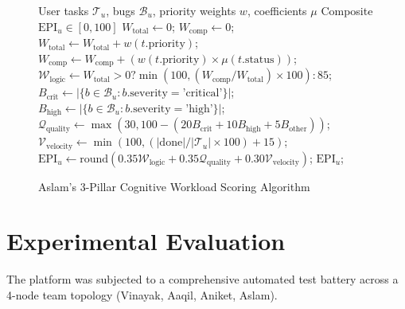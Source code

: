\documentclass[conference]{IEEEtran}
\begin{document}
\begin{figure}[!ht]
\begin{algorithmic}[1]
\REQUIRE User tasks $\mathcal{T}_u$, bugs $\mathcal{B}_u$, priority weights $w$, coefficients $\mu$
\ENSURE Composite $\text{EPI}_u \in [0, 100]$
\STATE $W_{\text{total}} \leftarrow 0$; $W_{\text{comp}} \leftarrow 0$;
    \STATE $W_{\text{total}} \leftarrow W_{\text{total}} + w(t.\text{priority})$;
    \STATE $W_{\text{comp}} \leftarrow W_{\text{comp}} + (w(t.\text{priority}) \times \mu(t.\text{status}))$;
\ENDFOR
\STATE $\mathcal{W}_{\text{logic}} \leftarrow W_{\text{total}} > 0 ? \min(100, (W_{\text{comp}} / W_{\text{total}}) \times 100) : 85$;
\STATE $B_{\text{crit}} \leftarrow |\{b \in \mathcal{B}_u : b.\text{severity} = \text{'critical'}\}|$;
\STATE $B_{\text{high}} \leftarrow |\{b \in \mathcal{B}_u : b.\text{severity} = \text{'high'}\}|$;
\STATE $\mathcal{Q}_{\text{quality}} \leftarrow \max(30, 100 - (20 B_{\text{crit}} + 10 B_{\text{high}} + 5 B_{\text{other}}))$;
\STATE $\mathcal{V}_{\text{velocity}} \leftarrow \min(100, (|\text{done}| / |\mathcal{T}_u| \times 100) + 15)$;
\STATE $\text{EPI}_u \leftarrow \text{round}(0.35 \mathcal{W}_{\text{logic}} + 0.35 \mathcal{Q}_{\text{quality}} + 0.30 \mathcal{V}_{\text{velocity}})$;
\RETURN $\text{EPI}_u$;
\end{algorithmic}
\caption{Aslam's 3-Pillar Cognitive Workload Scoring Algorithm}
\end{figure}

\section{Experimental Evaluation}
The platform was subjected to a comprehensive automated test battery across a 4-node team topology (Vinayak, Aaqil, Aniket, Aslam). 
\end{document}
